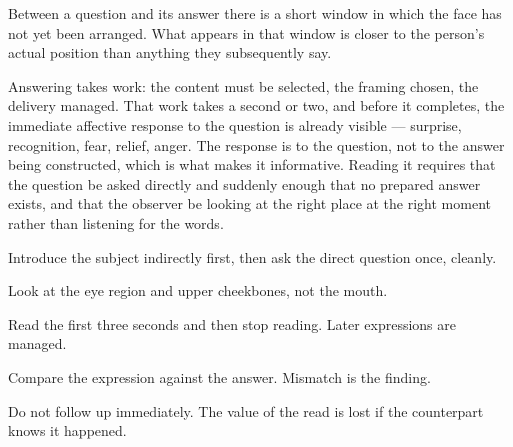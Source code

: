 


\begin{core}
Between a question and its answer there is a short window in which the face has not yet been arranged. What appears in that window is closer to the person's actual position than anything they subsequently say.
\end{core}

\begin{mechanism}
Answering takes work: the content must be selected, the framing chosen, the delivery managed. That work takes a second or two, and before it completes, the immediate affective response to the question is already visible --- surprise, recognition, fear, relief, anger. The response is to the question, not to the answer being constructed, which is what makes it informative. Reading it requires that the question be asked directly and suddenly enough that no prepared answer exists, and that the observer be looking at the right place at the right moment rather than listening for the words.
\end{mechanism}

\begin{application}
  \item Introduce the subject indirectly first, then ask the direct question once, cleanly.
  \item Look at the eye region and upper cheekbones, not the mouth.
  \item Read the first three seconds and then stop reading. Later expressions are managed.
  \item Compare the expression against the answer. Mismatch is the finding.
  \item Do not follow up immediately. The value of the read is lost if the counterpart knows it happened.
\end{application}


